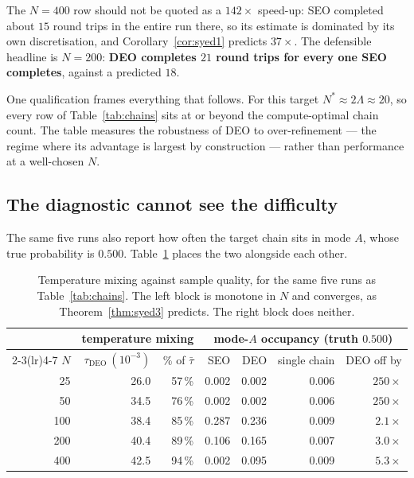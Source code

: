 The $N=400$ row should not be quoted as a $142\times$ speed-up: SEO completed
about $15$ round trips in the entire run there, so its estimate is dominated by
its own discretisation, and Corollary~\ref{cor:syed1} predicts $37\times$. The
defensible headline is $N=200$: \textbf{DEO completes $21$ round trips for every
one SEO completes}, against a predicted $18$.

One qualification frames everything that follows. For this target
$N^\ast\approx2\Lambda\approx20$, so every row of Table~\ref{tab:chains} sits at
or beyond the compute-optimal chain count. The table measures the robustness of
DEO to over-refinement --- the regime where its advantage is largest by
construction --- rather than performance at a well-chosen $N$.

\subsection{The diagnostic cannot see the difficulty}
\label{sec:results-blind}

The same five runs also report how often the target chain sits in mode $A$, whose
true probability is $0.500$. Table~\ref{tab:occ} places the two alongside each
other.

\begin{table}[htbp]
\centering
\caption{Temperature mixing against sample quality, for the same five runs as
Table~\ref{tab:chains}. The left block is monotone in $N$ and converges, as
Theorem~\ref{thm:syed3} predicts. The right block does neither.}
\label{tab:occ}
\footnotesize
\begin{tabular}{@{}rrrrrrr@{}}
\toprule
 & \multicolumn{2}{c}{temperature mixing}
 & \multicolumn{4}{c}{mode-$A$ occupancy (truth $0.500$)} \\
\cmidrule(lr){2-3}\cmidrule(lr){4-7}
$N$ & $\tau_{\mathrm{DEO}}\ (10^{-3})$ & \% of $\bar\tau$
 & SEO & DEO & single chain & DEO off by \\
\midrule
 25 & 26.0 & 57\,\% & 0.002 & 0.002 & 0.006 & $250\times$ \\
 50 & 34.5 & 76\,\% & 0.002 & 0.002 & 0.006 & $250\times$ \\
100 & 38.4 & 85\,\% & 0.287 & 0.236 & 0.009 & $2.1\times$ \\
200 & 40.4 & 89\,\% & 0.106 & 0.165 & 0.007 & $3.0\times$ \\
400 & 42.5 & 94\,\% & 0.002 & 0.095 & 0.009 & $5.3\times$ \\
\bottomrule
\end{tabular}
\end{table}

